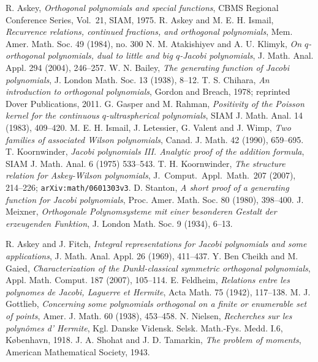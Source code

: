 \documentclass[twoside,11pt]{article}
\begin{document}
\begin{thebibliography}{999}
%
R. Askey,
{\em Orthogonal polynomials and special functions},
CBMS Regional Conference Series, Vol.~21, SIAM, 1975.
%
R. Askey and M. E. H. Ismail,
{\em Recurrence relations, continued fractions, and orthogonal polynomials},
Mem. Amer. Math. Soc. 49 (1984), no. 300
%
N. M. Atakishiyev and A. U. Klimyk,
{\em On $q$-orthogonal polynomials, dual to little and big
$q$-Jacobi polynomials},
J. Math. Anal. Appl. 294 (2004), 246--257.
%
W. N. Bailey,
{\em The generating function of Jacobi polynomials},
J. London Math. Soc. 13 (1938), 8--12.
%
T. S. Chihara,
{\em An introduction to orthogonal polynomials}, Gordon and Breach, 1978;
reprinted Dover Publications, 2011.
%
G. Gasper and M. Rahman,
{\em Positivity of the Poisson kernel for the continuous
$q$-ultraspherical polynomials},
SIAM J. Math. Anal. 14 (1983), 409--420.
%
M. E. H. Ismail, J. Letessier,  G. Valent and J. Wimp,
{\em Two families of associated Wilson polynomials},
Canad. J. Math. 42 (1990), 659--695.
%
T. Koornwinder,
{\em Jacobi polynomials III. Analytic proof of the addition formula},
SIAM J. Math. Anal. 6 (1975) 533--543.
%
T. H. Koornwinder,
{\em The structure relation for Askey-Wilson polynomials},
J.~Comput.\ Appl.\ Math.\ 207 (2007), 214--226; {\tt arXiv:math/0601303v3}.
%
D. Stanton,
{\em A short proof of a generating function for Jacobi polynomials},
Proc. Amer. Math. Soc. 80 (1980), 398--400.
%
J. Meixner,
{\em Orthogonale Polynomsysteme mit einer besonderen Gestalt der erzeugenden Funktion},
J. London Math. Soc. 9 (1934), 6--13.
%
\end{thebibliography}
%
\renewcommand{\refname}{Other references}
\begin{thebibliography}{999}
%
R. Askey and J. Fitch,
{\em Integral representations for Jacobi polynomials and some applications},
J. Math. Anal. Appl. 26 (1969), 411--437.
%
Y. Ben Cheikh and M. Gaied,
{\em Characterization of the Dunkl-classical symmetric orthogonal polynomials},
Appl. Math. Comput. 187 (2007), 105--114.
%
E. Feldheim,
{\em Relations entre les polynomes de Jacobi, Laguerre et Hermite},
Acta Math. 75 (1942), 117--138.
%
M. J. Gottlieb,
{\em Concerning some polynomials orthogonal on a finite or enumerable set of  points},
Amer. J. Math. 60 (1938), 453--458.
%
N. Nielsen,
{\em Recherches sur les polyn\^omes d' Hermite},
Kgl. Danske Vidensk. Selsk. Math.-Fys. Medd. I.6, K\o benhavn, 1918.
%
J. A. Shohat and J. D. Tamarkin,
{\em The problem of moments},
American Mathematical Society, 1943.
%
\end{thebibliography}
\end{document}
